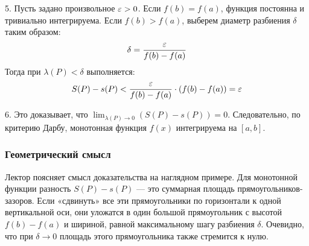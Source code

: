 \begin{tcolorbox}[title=Доказательство, breakable]
5. Пусть задано произвольное $\varepsilon > 0$. Если $f(b) = f(a)$, функция постоянна и тривиально интегрируема. Если $f(b) > f(a)$, выберем диаметр разбиения $\delta$ таким образом:
\[ \delta = \frac{\varepsilon}{f(b) - f(a)} \]
Тогда при $\lambda(P) < \delta$ выполняется:
\[ S(P) - s(P) < \frac{\varepsilon}{f(b) - f(a)} \cdot (f(b) - f(a)) = \varepsilon \]

6. Это доказывает, что $\lim_{\lambda(P) \to 0} (S(P) - s(P)) = 0$. Следовательно, по критерию Дарбу, монотонная функция $f(x)$ интегрируема на $[a, b]$.
\end{tcolorbox}

\subsubsection*{Геометрический смысл}
Лектор поясняет смысл доказательства на наглядном примере. Для монотонной функции разность $S(P) - s(P)$ — это суммарная площадь прямоугольников-зазоров. Если «сдвинуть» все эти прямоугольники по горизонтали к одной вертикальной оси, они уложатся в один большой прямоугольник с высотой $f(b) - f(a)$ и шириной, равной максимальному шагу разбиения $\delta$. Очевидно, что при $\delta \to 0$ площадь этого прямоугольника также стремится к нулю.


